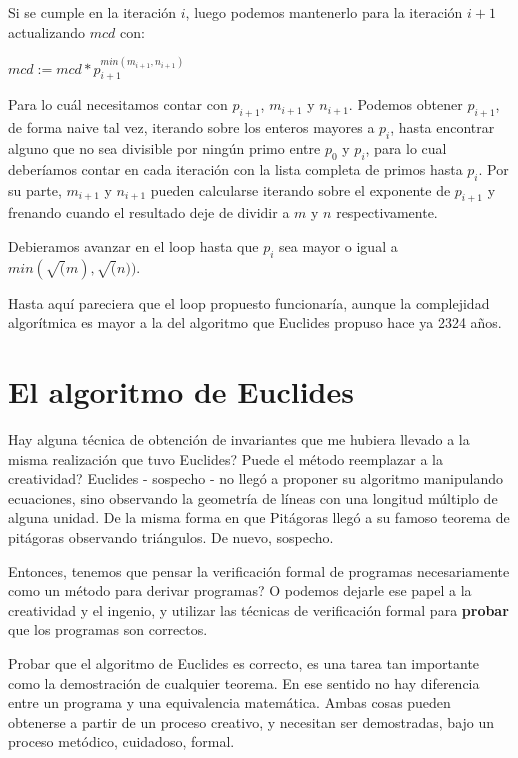 \documentclass[12pt, a4paper, openany, fleqn]{book}
\begin{document}
    Si se cumple en la iteración $i$, luego podemos mantenerlo para la iteración $i+1$ actualizando $mcd$ con:

    \begin{center}
        \begin{math}
            mcd := mcd * p_{i+1}^{min(m_{i+1}, n_{i+1})}
        \end{math}
    \end{center}

    Para lo cuál necesitamos contar con $p_{i+1}$, $m_{i+1}$ y $n_{i+1}$. Podemos obtener $p_{i+1}$, de forma naive tal vez, iterando sobre los enteros mayores a $p_{i}$, hasta encontrar alguno que no sea divisible por ningún primo entre $p_0$ y $p_{i}$, para lo cual deberíamos contar en cada iteración con la lista completa de primos hasta $p_{i}$. Por su parte, $m_{i+1}$ y $n_{i+1}$ pueden calcularse iterando sobre el exponente de $p_{i+1}$ y frenando cuando el resultado deje de dividir a $m$ y $n$ respectivamente.

    Debieramos avanzar en el loop hasta que $p_i$ sea mayor o igual a $min(\sqrt(m), \sqrt(n))$.

    Hasta aquí pareciera que el loop propuesto funcionaría, aunque la complejidad algorítmica es mayor a la del algoritmo que Euclides propuso hace ya 2324 años.

    \section{El algoritmo de Euclides}
    Hay alguna técnica de obtención de invariantes que me hubiera llevado a la misma realización que tuvo Euclides? Puede el método reemplazar a la creatividad?
    Euclides - sospecho - no llegó a proponer su algoritmo manipulando ecuaciones, sino observando la geometría de líneas con una longitud múltiplo de alguna unidad. De la misma forma en que Pitágoras llegó a su famoso teorema de pitágoras observando triángulos. De nuevo, sospecho.

    Entonces, tenemos que pensar la verificación formal de programas necesariamente como un método para derivar programas? O podemos dejarle ese papel a la creatividad y el ingenio, y utilizar las técnicas de verificación formal para \textbf{probar} que los programas son correctos.

    Probar que el algoritmo de Euclides es correcto, es una tarea tan importante como la demostración de cualquier teorema. En ese sentido no hay diferencia entre un programa y una equivalencia matemática. Ambas cosas pueden obtenerse a partir de un proceso creativo, y necesitan ser demostradas, bajo un proceso metódico, cuidadoso, formal.
\end{document}
